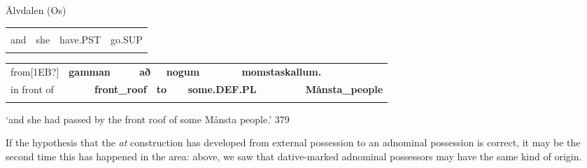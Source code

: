 
\begin{listWWNumileveli}
\item 

\begin{styleExample}
Älvdalen (Os)

\end{styleExample}

\end{listWWNumileveli}

\begin{tabular}{llll}
\lsptoprule
\multicolumn{4}{l}{Og

}\\
and & she & have.PST & go.SUP\\
\lspbottomrule
\end{tabular}

\begin{tabular}{llllllllll}
\lsptoprule
from[1EB?] & \multicolumn{2}{l}{{\bfseries gamman}

} & \multicolumn{2}{l}{{\bfseries að}

} & \multicolumn{2}{l}{{\bfseries nogum}

} & \multicolumn{2}{l}{{\bfseries momstaskallum.}

} & \\
\multicolumn{2}{l}{in front of 

} & \multicolumn{2}{l}{{\bfseries front\_roof}

} & \multicolumn{2}{l}{{\bfseries to}

} & \multicolumn{2}{l}{{\bfseries some.DEF.PL}

} & \multicolumn{2}{l}{{\bfseries Månsta\_people}

}\\
\lspbottomrule
\end{tabular}

\begin{styleTranslation}
‘and she had passed by the front roof of some Månsta people.’ 379

\end{styleTranslation}

\begin{styleBodyTextFirst}
If the hypothesis that the \textit{at} construction has developed from external possession to an adnominal possession is correct, it may be the second time this has happened in the area: above, we saw that dative-marked adnominal possessors may have the same kind of origin. 

\end{styleBodyTextFirst}

